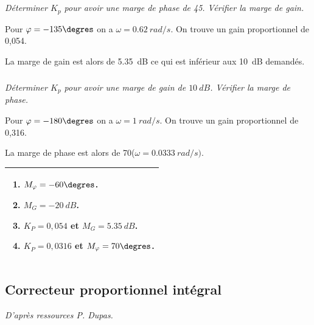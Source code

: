 \documentclass[10pt,fleqn]{article} %
\begin{document}
\begin{multicols}{2}
\subparagraph{}\textit{Déterminer $K_p$ pour avoir une marge de phase de 45\degres. Vérifier la marge de gain. }
\ifprof
\begin{corrige}
Pour $\varphi=-135\degres$ on a $\omega=\SI{0,62}{rad/s}$. On trouve un gain proportionnel de 0,054.

La marge de gain est alors de \SI{5,35}{dB} ce qui est inférieur aux \SI{10}{dB} demandés.
\end{corrige}
\else
\fi

\subparagraph{}\textit{Déterminer $K_p$ pour avoir une marge de gain de $\SI{10}{dB}$. Vérifier la marge de phase. }
\ifprof
\begin{corrige}
Pour $\varphi=-180\degres$ on a $\omega=\SI{1}{rad/s}$. On trouve un gain proportionnel de 0,316.

La marge de phase est alors de 70\degres ($\omega=\SI{0,0333}{rad/s})$.
\end{corrige}
\else
\fi


\noindent
\begin{tabular}{|p{.9\linewidth}|}
\hline
\begin{enumerate}
\item $M_{\varphi}=-60\degres$.
\item $M_G=\SI{-20}{dB}$.
\item $K_P=0,054$ et $M_{G}=\SI{5,35}{dB}$.
\item $K_P=0,0316$ et $M_{\varphi}=70\degres$.
\end{enumerate}\\
\hline
\end{tabular}





%
%

\subsection*{Correcteur proportionnel intégral}
\textit{D'après ressources P. Dupas.}
\setcounter{exo}{0}


\end{multicols}
\end{document}
